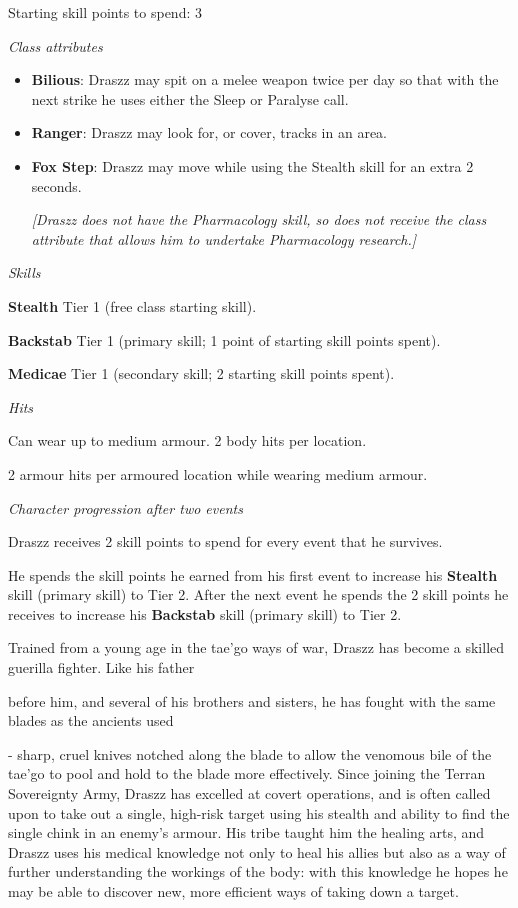 Starting skill points to spend: 3

\textit{Class attributes}

\begin{itemize}
\item \textbf{Bilious}: Draszz may spit on a melee weapon twice per day so that with the next strike he uses either the Sleep or Paralyse call.

\item \textbf{Ranger}: Draszz may look for, or cover, tracks in an area.

\item \textbf{Fox Step}: Draszz may move while using the Stealth skill for an extra 2 seconds.

\textit{{[}Draszz does not have the Pharmacology skill, so does not receive the class attribute that allows him to undertake Pharmacology research.{]}}

\end{itemize}
\textit{Skills}

\textbf{Stealth} Tier 1 (free class starting skill).

\textbf{Backstab} Tier 1 (primary skill; 1 point of starting skill points spent).

\textbf{Medicae} Tier 1 (secondary skill; 2 starting skill points spent).

\textit{Hits}

Can wear up to medium armour. 2 body hits per location.

2 armour hits per armoured location while wearing medium armour.

\textit{Character progression after two events}

Draszz receives 2 skill points to spend for every event that he survives.

He spends the skill points he earned from his first event to increase his \textbf{Stealth} skill (primary skill) to Tier 2. After the next event he spends the 2 skill points he receives to increase his \textbf{Backstab} skill (primary skill) to Tier 2.

Trained from a young age in the tae'go ways of war, Draszz has become a skilled guerilla fighter. Like his father

before him, and several of his brothers and sisters, he has fought with the same blades as the ancients used

- sharp, cruel knives notched along the blade to allow the venomous bile of the tae'go to pool and hold to the blade more effectively. Since joining the Terran Sovereignty Army, Draszz has excelled at covert operations, and is often called upon to take out a single, high-risk target using his stealth and ability to find the single chink in an enemy's armour. His tribe taught him the healing arts, and Draszz uses his medical knowledge not only to heal his allies but also as a way of further understanding the workings of the body: with this knowledge he hopes he may be able to discover new, more efficient ways of taking down a target.

